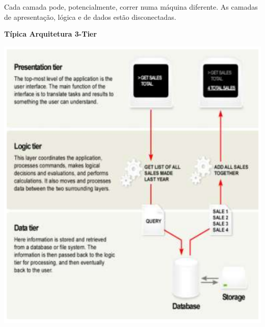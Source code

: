 \documentclass{article}
\begin{document}
\begin{flushleft}
  Cada camada pode, potencialmente, correr numa máquina diferente.
  As camadas de apresentação, lógica e de dados estão disconectadas. 
\end{flushleft}

\begin{flushleft}
  \textbf{Típica Arquitetura 3-Tier}
\end{flushleft}

\vspace{5mm}

\begin{center}
  \includegraphics[scale=0.3]{6}
\end{center}


\pagebreak
\end{document}
